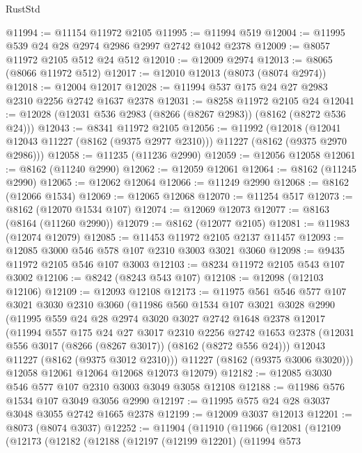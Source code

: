 \begin{lexlean}{RustStd}
\begin{coremodule}
@11994 := @11154 @11972 @2105
@11995 := @11994 @519
@12004 := @11995 @539 @24 @28 @2974 @2986 @2997 @2742 @1042 @2378
@12009 := @8057 @11972 @2105 @512 @24 @512
@12010 := @12009 @2974
@12013 := @8065 (@8066 @11972 @512)
@12017 := @12010 @12013 (@8073 (@8074 @2974))
@12018 := @12004 @12017
@12028 := @11994 @537 @175 @24 @27 @2983 @2310 @2256 @2742 @1637 @2378
@12031 := @8258 @11972 @2105 @24
@12041 := @12028 (@12031 @536 @2983 (@8266 (@8267 @2983)) (@8162 (@8272 @536 @24)))
@12043 := @8341 @11972 @2105
@12056 := @11992
    (@12018 (@12041 @12043 @11227 (@8162 (@9375 @2977 @2310))) @11227 (@8162 (@9375 @2970 @2986)))
@12058 := @11235 (@11236 @2990)
@12059 := @12056 @12058
@12061 := @8162 (@11240 @2990)
@12062 := @12059 @12061
@12064 := @8162 (@11245 @2990)
@12065 := @12062 @12064
@12066 := @11249 @2990
@12068 := @8162 (@12066 @1534)
@12069 := @12065 @12068
@12070 := @11254 @517
@12073 := @8162 (@12070 @1534 @107)
@12074 := @12069 @12073
@12077 := @8163 (@8164 (@11260 @2990))
@12079 := @8162 (@12077 @2105)
@12081 := @11983 (@12074 @12079)
@12085 := @11453 @11972 @2105 @2137 @11457
@12093 := @12085 @3000 @546 @578 @107 @2310 @3003 @3021 @3060
@12098 := @9435 @11972 @2105 @546 @107 @3003
@12103 := @8234 @11972 @2105 @543 @107 @3002
@12106 := @8242 (@8243 @543 @107)
@12108 := @12098 (@12103 @12106)
@12109 := @12093 @12108
@12173 := @11975
    @561
    @546
    @577
    @107
    @3021
    @3030
    @2310
    @3060
    (@11986
      @560
      @1534
      @107
      @3021
      @3028
      @2990
      (@11995
        @559
        @24
        @28
        @2974
        @3020
        @3027
        @2742
        @1648
        @2378
        @12017
        (@11994
          @557
          @175
          @24
          @27
          @3017
          @2310
          @2256
          @2742
          @1653
          @2378
          (@12031 @556 @3017 (@8266 (@8267 @3017)) (@8162 (@8272 @556 @24)))
          @12043
          @11227
          (@8162 (@9375 @3012 @2310)))
        @11227
        (@8162 (@9375 @3006 @3020)))
      @12058
      @12061
      @12064
      @12068
      @12073
      @12079)
@12182 := @12085 @3030 @546 @577 @107 @2310 @3003 @3049 @3058 @12108
@12188 := @11986 @576 @1534 @107 @3049 @3056 @2990
@12197 := @11995 @575 @24 @28 @3037 @3048 @3055 @2742 @1665 @2378
@12199 := @12009 @3037 @12013
@12201 := @8073 (@8074 @3037)
@12252 := @11904
    (@11910
      (@11966
        (@12081
          (@12109
            (@12173
              (@12182
                (@12188
                  (@12197
                    (@12199 @12201)
                    (@11994
                      @573

\end{coremodule}
\end{lexlean}
